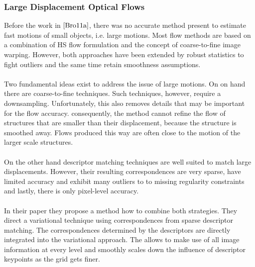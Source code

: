 \subsubsection{Large Displacement Optical Flows}
Before the work in $\cite{Bro11a}$, there was no accurate method present to estimate fast motions of small objects, i.e. large motions. Most flow methods are based on a combination of HS flow formulation and the concept of coarse-to-fine image warping. However, both approaches have been extended by robust statistics to fight outliers and the same time retain smoothness assumptions. \\ \\
Two fundamental ideas exist to address the issue of large motions. On on hand there are coarse-to-fine techniques. Such techniques, however, require a downsampling. Unfortunately, this also removes details that may be important for the flow accuracy. consequently, the method cannot refine the flow of structures that are smaller than their displacement, because the structure is smoothed away. Flows produced this way are often close to the motion of the larger scale structures. \\ \\
On the other hand descriptor matching techniques are well suited to match large displacements. However, their resulting correspondences are very sparse, have limited accuracy and exhibit many outliers to to missing regularity constraints and lastly, there is only pixel-level accuracy. \\ \\
In their paper they propose a method how to combine both strategies. They direct a variational technique using correspondences from sparse descriptor matching. The correspondences determined by the descriptors are directly integrated into the variational approach. The allows to make use of all image information at every level and smoothly scales down the influence of descriptor keypoints as the grid gets finer.

